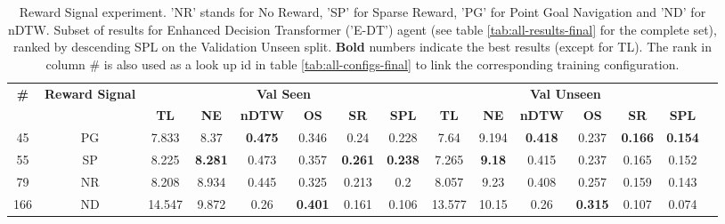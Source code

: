 \begin{table}
\centering
\caption{\label{tab:e_dt_reward_type}Reward Signal experiment. ’NR’ stands for No Reward, ’SP’ for Sparse Reward, ’PG’ for Point Goal Navigation and ’ND’ for nDTW. Subset of results for Enhanced Decision Transformer ('E-DT') agent (see table \ref{tab:all-results-final} for the complete set), ranked by descending SPL on the Validation Unseen split. \textbf{Bold} numbers indicate the best results (except for TL). The rank in column \# is also used as a look up id in table \ref{tab:all-configs-final} to link the corresponding training configuration.}
\begin{tabular}{@{\hskip3pt}c@{\hskip3pt}c@{\hskip3pt}c@{\hskip3pt}c@{\hskip3pt}c@{\hskip3pt}c@{\hskip3pt}c@{\hskip3pt}c@{\hskip3pt}c@{\hskip3pt}c@{\hskip3pt}c@{\hskip3pt}c@{\hskip3pt}c@{\hskip3pt}c@{\hskip3pt}c}
\toprule
                                  \textbf{\#} & \textbf{Reward Signal} & \multicolumn{6}{c}{\textbf{Val Seen}} & \multicolumn{6}{c}{\textbf{Val Unseen}} \\
\cmidrule(l){3-8}\cmidrule(l){9-14}\textbf{~} &             \textbf{~} &       \textbf{TL} &     \textbf{NE} &   \textbf{nDTW} &     \textbf{OS} &     \textbf{SR} &    \textbf{SPL} &         \textbf{TL} &    \textbf{NE} &   \textbf{nDTW} &     \textbf{OS} &     \textbf{SR} &    \textbf{SPL} \\
\midrule
                                           45 &                     PG &             7.833 &            8.37 &  \textbf{0.475} &           0.346 &            0.24 &           0.228 &                7.64 &          9.194 &  \textbf{0.418} &           0.237 &  \textbf{0.166} &  \textbf{0.154} \\
                                           55 &                     SP &             8.225 &  \textbf{8.281} &           0.473 &           0.357 &  \textbf{0.261} &  \textbf{0.238} &               7.265 &  \textbf{9.18} &           0.415 &           0.237 &           0.165 &           0.152 \\
                                           79 &                     NR &             8.208 &           8.934 &           0.445 &           0.325 &           0.213 &             0.2 &               8.057 &           9.23 &           0.408 &           0.257 &           0.159 &           0.143 \\
                                          166 &                     ND &            14.547 &           9.872 &            0.26 &  \textbf{0.401} &           0.161 &           0.106 &              13.577 &          10.15 &            0.26 &  \textbf{0.315} &           0.107 &           0.074 \\
\bottomrule
\end{tabular}
\end{table}
